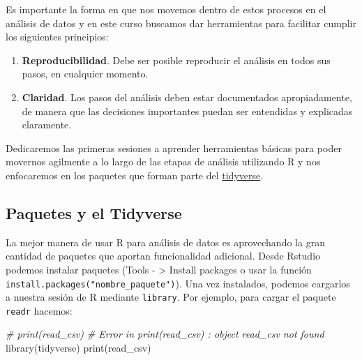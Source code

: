\documentclass[
]{book}
\newenvironment{Shaded}{\begin{snugshade}}{\end{snugshade}}
\newcommand{\CommentTok}[1]{\textcolor[rgb]{0.56,0.35,0.01}{\textit{#1}}}
\newcommand{\FunctionTok}[1]{\textcolor[rgb]{0.00,0.00,0.00}{#1}}
\newcommand{\NormalTok}[1]{#1}
\begin{document}
Es importante la forma en que nos movemos dentro de estos procesos en el
análisis de datos y en este curso buscamos dar herramientas para facilitar
cumplir los siguientes principios:

\begin{enumerate}
\def\labelenumi{\arabic{enumi}.}
\item
  \textbf{Reproducibilidad}. Debe ser posible reproducir el análisis en todos sus
  pasos, en cualquier momento.
\item
  \textbf{Claridad}. Los pasos del análisis deben estar documentados apropiadamente,
  de manera que las decisiones importantes puedan ser entendidas y explicadas
  claramente.
\end{enumerate}

Dedicaremos las primeras sesiones a aprender herramientas básicas para poder
movernos agilmente a lo largo de las etapas de análisis utilizando R y nos
enfocaremos en los paquetes que forman parte del
\href{http://tidyverse.org/}{tidyverse}.

\hypertarget{paquetes-y-el-tidyverse}{%
\subsection*{Paquetes y el Tidyverse}\label{paquetes-y-el-tidyverse}}

La mejor manera de usar R para análisis de datos es aprovechando la gran
cantidad de paquetes que aportan funcionalidad adicional. Desde
Rstudio podemos instalar paquetes (Tools - \textgreater{} Install packages o usar la
función \texttt{install.packages("nombre\_paquete")}). Una vez instalados, podemos
cargarlos a nuestra sesión de R mediante \texttt{library}. Por ejemplo, para cargar el
paquete \texttt{readr} hacemos:

\begin{Shaded}
\begin{Highlighting}[]
\CommentTok{\# print(read\_csv)}
\CommentTok{\# Error in print(read\_csv) : object \textquotesingle{}read\_csv\textquotesingle{} not found}
\FunctionTok{library}\NormalTok{(tidyverse)}
\FunctionTok{print}\NormalTok{(read\_csv)}
\end{Highlighting}
\end{Shaded}
\end{document}
